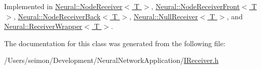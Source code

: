 Implemented in \hyperlink{class_neural_1_1_node_receiver_a3775af35d7b619c799e377bacf29f0d7}{Neural::NodeReceiver$<$ T $>$}, \hyperlink{class_neural_1_1_node_receiver_front_a7d9e947a159607ad16b98c0a57c2c7cf}{Neural::NodeReceiverFront$<$ T $>$}, \hyperlink{class_neural_1_1_node_receiver_back_add5216320f1d7f70b328f4ba298d0707}{Neural::NodeReceiverBack$<$ T $>$}, \hyperlink{class_neural_1_1_null_receiver_a69a5ae7e033eff1fca724ce6364ad807}{Neural::NullReceiver$<$ T $>$}, and \hyperlink{class_neural_1_1_receiver_wrapper_a81f65c6cb6dcb955ef7fb5b7b5acdbf3}{Neural::ReceiverWrapper$<$ T $>$}.



The documentation for this class was generated from the following file:\begin{DoxyCompactItemize}
\item 
/Users/seimon/Development/NeuralNetworkApplication/\hyperlink{_i_receiver_8h}{IReceiver.h}\end{DoxyCompactItemize}

